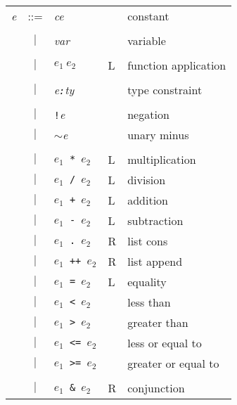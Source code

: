 \documentclass[11pt]{article}
\begin{document}
\begin{table}[p]
\centering\tightlines\normalsize
\begin{tabular}{|rcp{54mm}p{5mm}p{68mm}|}  \hline
{\it e} &  ::= & {\it ce}                &  & constant \\[-0.6em]
    &     &                              &  & \\
    & $|$ &  {\it var}                   &  & variable \\[-0.6em]
    &     &                              &  & \\
    & $|$ &  $e_{1}\ e_{2}$               &L & function application \\[-0.6em]
    &     &                              &  & \\
    & $|$ &  {\it e{\tt :}ty}            &  & type constraint \\[-0.6em]
    &     &                              &  & \\
    & $|$ &  {\tt !}{\it e}             &  & negation \\
    & $|$ &  {\tt $\sim$}{\it e}         &  & unary minus \\[-0.6em]
    &     &                              &  & \\
    & $|$ &  $e_{1}${\tt\ *\ }$e_{2}$     &L & multiplication \\
    & $|$ &  $e_{1}${\tt\ /\ }$e_{2}$     &L & division \\
    & $|$ &  $e_{1}${\tt\ +\ }$e_{2}$     &L & addition \\
    & $|$ &  $e_{1}${\tt\ -\ }$e_{2}$     &L & subtraction \\
    & $|$ &  $e_{1}${\tt\ .\ }$e_{2}$     &R & list cons \\
    & $|$ &  $e_{1}${\tt\ ++\ }$e_{2}$    &R & list append \\
    & $|$ &  $e_{1}${\tt\ =\ }$e_{2}$     &L & equality \\
    & $|$ &  $e_{1}${\tt\ <\ }$e_{2}$     &  & less than \\
    & $|$ &  $e_{1}${\tt\ >\ }$e_{2}$     &  & greater than \\
    & $|$ &  $e_{1}${\tt\ <=\ }$e_{2}$    &  & less or equal to \\
    & $|$ &  $e_{1}${\tt\ >=\ }$e_{2}$    &  & greater or equal to \\ [-0.6em]
    &     &                              &  & \\
    & $|$ &  $e_{1}${\tt\ \&\ }$e_{2}$    &R & conjunction \\

\end{tabular}
\end{table}
\end{document}
